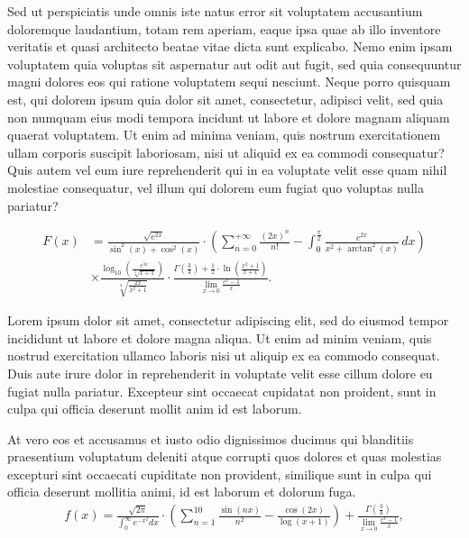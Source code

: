 \documentclass[a0,portrait]{a0poster}
\begin{document}
\begin{mdframed}[style=MyFrame]
\begin{multicols}{2}
			Sed ut perspiciatis unde omnis iste natus error sit voluptatem accusantium doloremque laudantium, totam rem aperiam, eaque ipsa quae ab illo inventore veritatis et quasi architecto beatae vitae dicta sunt explicabo. Nemo enim ipsam voluptatem quia voluptas sit aspernatur aut odit aut fugit, sed quia consequuntur magni dolores eos qui ratione voluptatem sequi nesciunt. Neque porro quisquam est, qui dolorem ipsum quia dolor sit amet, consectetur, adipisci velit, sed quia non numquam eius modi tempora incidunt ut labore et dolore magnam aliquam quaerat voluptatem. Ut enim ad minima veniam, quis nostrum exercitationem ullam corporis suscipit laboriosam, nisi ut aliquid ex ea commodi consequatur? Quis autem vel eum iure reprehenderit qui in ea voluptate velit esse quam nihil molestiae consequatur, vel illum qui dolorem eum fugiat quo voluptas nulla pariatur?
			
			\begin{align}
				F(x) &= \frac{\sqrt{e^{2x}}}{\sin^2(x) + \cos^2(x)} \cdot \left(\sum_{n=0}^{+\infty} \frac{(2x)^n}{n!} - \int_{0}^{\frac{\pi}{2}} \frac{e^{2x}}{x^2 + \arctan^2(x)} \, dx\right) \nonumber \\
				&\times\frac{\log_{10}\left(\frac{e^{3x}}{\sqrt[3]{x+1}}\right)}{\sqrt[4]{\frac{2x}{x^2 + 1}}} \cdot \frac{\Gamma\left(\frac{3}{4}\right) + \frac{1}{2} \cdot \ln\left(\frac{x^2 + 1}{x+1}\right)}{\lim_{{x \to 0}} \frac{e^x - 1}{x}}.
			\end{align}
			
			Lorem ipsum dolor sit amet, consectetur adipiscing elit, sed do eiusmod tempor incididunt ut labore et dolore magna aliqua. Ut enim ad minim veniam, quis nostrud exercitation ullamco laboris nisi ut aliquip ex ea commodo consequat. Duis aute irure dolor in reprehenderit in voluptate velit esse cillum dolore eu fugiat nulla pariatur. Excepteur sint occaecat cupidatat non proident, sunt in culpa qui officia deserunt mollit anim id est laborum.
			
			At vero eos et accusamus et iusto odio dignissimos ducimus qui blanditiis praesentium voluptatum deleniti atque corrupti quos dolores et quas molestias excepturi sint occaecati cupiditate non provident, similique sunt in culpa qui officia deserunt mollitia animi, id est laborum et dolorum fuga.
			\begin{equation}\label{eqn:L}
				\begin{split}
					f(x) = \frac{\sqrt{2 \pi}}{\int_{0}^{\infty} e^{-x^2} dx} \cdot \left(\sum_{n=1}^{10} \frac{\sin(nx)}{n^2} - \frac{\cos(2x)}{\log(x+1)}\right) + \frac{\Gamma\left(\frac{3}{4}\right)}{\lim_{{x \to 0}} \frac{e^x - 1}{x}},
				\end{split}
			\end{equation}
			

\end{multicols}
\end{mdframed}
\end{document}
